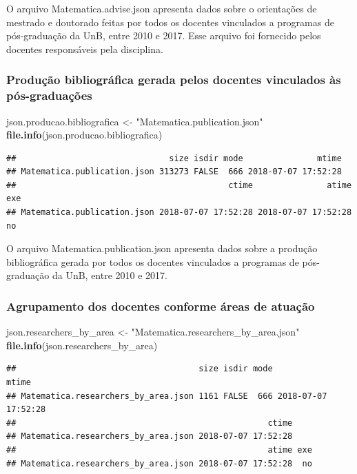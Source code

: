 \documentclass[]{article}
\newenvironment{Shaded}{\begin{snugshade}}{\end{snugshade}}
\newcommand{\KeywordTok}[1]{\textcolor[rgb]{0.13,0.29,0.53}{\textbf{#1}}}
\newcommand{\StringTok}[1]{\textcolor[rgb]{0.31,0.60,0.02}{#1}}
\newcommand{\NormalTok}[1]{#1}
\begin{document}
O arquivo Matematica.advise.json apresenta dados sobre o orientações de
mestrado e doutorado feitas por todos os docentes vinculados a programas
de pós-graduação da UnB, entre 2010 e 2017. Esse arquivo foi fornecido
pelos docentes responsáveis pela disciplina.

\subsubsection{Produção bibliográfica gerada pelos docentes vinculados
às
pós-graduações}\label{producao-bibliografica-gerada-pelos-docentes-vinculados-as-pos-graduacoes}

\begin{Shaded}
\begin{Highlighting}[]
\NormalTok{json.producao.bibliografica <-}\StringTok{ "Matematica.publication.json"}
\KeywordTok{file.info}\NormalTok{(json.producao.bibliografica) }
\end{Highlighting}
\end{Shaded}

\begin{verbatim}
##                               size isdir mode               mtime
## Matematica.publication.json 313273 FALSE  666 2018-07-07 17:52:28
##                                           ctime               atime exe
## Matematica.publication.json 2018-07-07 17:52:28 2018-07-07 17:52:28  no
\end{verbatim}

O arquivo Matematica.publication.json apresenta dados sobre a produção
bibliográfica gerada por todos os docentes vinculados a programas de
pós-graduação da UnB, entre 2010 e 2017.

\subsubsection{Agrupamento dos docentes conforme áreas de
atuação}\label{agrupamento-dos-docentes-conforme-areas-de-atuacao}

\begin{Shaded}
\begin{Highlighting}[]
\NormalTok{json.researchers_by_area <-}\StringTok{ "Matematica.researchers_by_area.json"} 
\KeywordTok{file.info}\NormalTok{(json.researchers_by_area)}
\end{Highlighting}
\end{Shaded}

\begin{verbatim}
##                                     size isdir mode               mtime
## Matematica.researchers_by_area.json 1161 FALSE  666 2018-07-07 17:52:28
##                                                   ctime
## Matematica.researchers_by_area.json 2018-07-07 17:52:28
##                                                   atime exe
## Matematica.researchers_by_area.json 2018-07-07 17:52:28  no
\end{verbatim}
\end{document}
